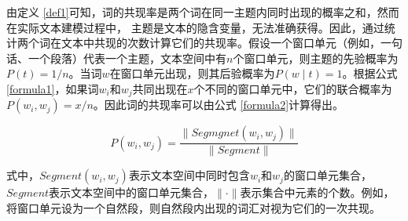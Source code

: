 
由定义 \ref{def1}可知，词的共现率是两个词在同一主题内同时出现的概率之和，然而在实际文本建模过程中， 主题是文本的隐含变量，无法准确获得。因此，通过统计两个词在文本中共现的次数计算它们的共现率。假设一个窗口单元（例如，一句话、一个段落）代表一个主题，文本空间中有$n$个窗口单元，则主题的先验概率为$P(t) = 1 / n$。当词$w$在窗口单元出现，则其后验概率为$P(w \mid t) = 1$。根据公式
\ref{formula1}，如果词$w_i$和$w_j$共同出现在$x$个不同的窗口单元中，它们的联合概率为$P(w_i, w_j)= x / n$。因此词的共现率可以由公式 \ref{formula2}计算得出。

\begin{equation}
P(w_i, w_j) = \frac{\parallel Segmgnet(w_i, w_j) \parallel}{\parallel Segment \parallel}
\label{formula2}
\end{equation} 

式中，$Segment(w_i, w_j)$表示文本空间中同时包含$w_i$和$w_j$的窗口单元集合，$Segment$表示文本空间中的窗口单元集合，$\parallel \cdot \parallel$表示集合中元素的个数。例如，将窗口单元设为一个自然段，则自然段内出现的词汇对视为它们的一次共现。
